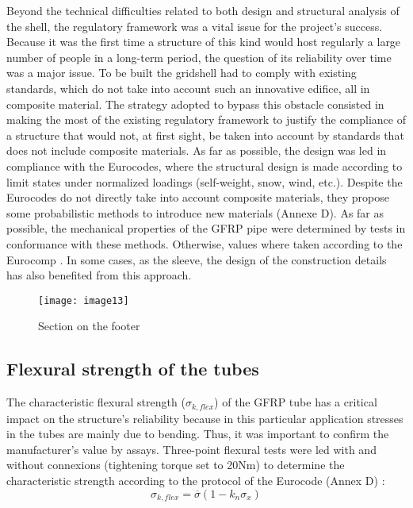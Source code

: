 Beyond the technical difficulties related to both design and structural analysis of the shell, the regulatory framework was a vital issue for the project’s success. Because it was the first time a structure of this kind would host regularly a large number of people in a long-term period, the question of its reliability over time was a major issue. To be built the gridshell had to comply with existing standards, which do not take into account such an innovative edifice, all in composite material. The strategy adopted to bypass this obstacle consisted in making the most of the existing regulatory framework to justify the compliance of a structure that would not, at first sight, be taken into account by standards that does not include composite materials.
As far as possible, the design was led in compliance with the Eurocodes, where the structural design is made according to limit states under normalized loadings (self-weight, snow, wind, etc.). Despite the Eurocodes do not directly take into account composite materials, they propose some probabilistic methods to introduce new materials (Annexe D). As far as possible, the mechanical properties of the GFRP pipe were determined by tests in conformance with these methods. Otherwise, values where taken according to the Eurocomp \citep{Clarke2003}.  In some cases, as the sleeve, the design of the construction details has also benefited from this approach.

\begin{figure}[t]
	\centering
		\texttt{[image: image13]}
	\caption{Section on the footer}
	\label{fig:9}
\end{figure}

\subsection{Flexural strength of the tubes}
The characteristic flexural strength ($\sigma_{k,flex}$) of the GFRP tube has a critical impact on the structure’s reliability because in this particular application stresses in the tubes are mainly due to bending. Thus, it was important to confirm the manufacturer’s value by assays. 
Three-point flexural tests were led with and without connexions (tightening torque set to 20Nm) to determine the characteristic strength according to the protocol of the Eurocode (Annex D) :
\begin{equation}
\sigma_{k,flex}=\overline{\sigma}(1-k_n\sigma_x)
\end{equation}

